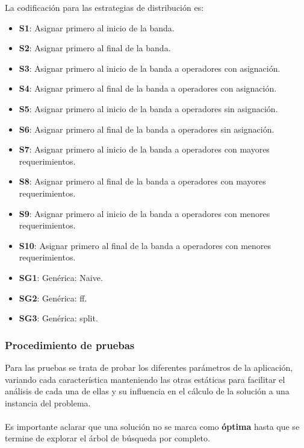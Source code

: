 La codificación para las estrategias de distribución es:

\begin{itemize}
	\item \textbf{S1}: Asignar primero al inicio de la banda.
	\item \textbf{S2}: Asignar primero al final de la banda.
	\item \textbf{S3}: Asignar primero al inicio de la banda a operadores con asignación.
	\item \textbf{S4}: Asignar primero al final de la banda a operadores con asignación.
	\item \textbf{S5}: Asignar primero al inicio de la banda a operadores sin asignación.
	\item \textbf{S6}: Asignar primero al final de la banda a operadores sin asignación.
	\item \textbf{S7}: Asignar primero al inicio de la banda a operadores con mayores requerimientos.
	\item \textbf{S8}: Asignar primero al final de la banda a operadores con mayores requerimientos.
	\item \textbf{S9}: Asignar primero al inicio de la banda a operadores con menores requerimientos.
	\item \textbf{S10}: Asignar primero al final de la banda a operadores con menores requerimientos.
	\item \textbf{SG1}: Genérica: Naive.
	\item \textbf{SG2}: Genérica: ff.
	\item \textbf{SG3}: Genérica: split.
\end{itemize}

\subsubsection{Procedimiento de pruebas}

Para las pruebas se trata de probar los diferentes parámetros de la aplicación, variando cada característica manteniendo las otras estáticas para facilitar el análisis de cada una de ellas y su influencia en el cálculo de la solución a una instancia del problema.
\\\\
Es importante aclarar que una solución no se marca como \textbf{óptima} hasta que se termine de explorar el árbol de búsqueda por completo.

